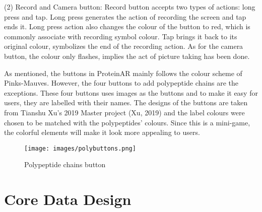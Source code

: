(2) Record and Camera button: Record button accepts two types of actions: long press and tap. Long press generates the action of recording the screen and tap ends it. Long press action also changes the colour of the button to red, which is commonly associate with recording symbol colour. Tap brings it back to its original colour, symbolizes the end of the recording action. As for the camera button, the colour only flashes, implies the act of picture taking has been done. 

As mentioned, the buttons in ProteinAR mainly follows the colour scheme of Pinks-Mauves. However, the four buttons to add polypeptide chains are the exceptions. These four buttons uses images as the buttons and to make it easy for users, they are labelled with their names. The designs of the buttons are taken from Tianshu Xu’s 2019 Master project (Xu, 2019) and the label colours were chosen to be matched with the polypeptides’ colours. Since this is a mini-game, the colorful elements will make it look more appealing to users. 
\begin{figure}[hbt!]
	\centering
	\texttt{[image: images/polybuttons.png]}
	\caption{Polypeptide chains button}
	\label{fig:polybuttons}
\end{figure}

\section{Core Data Design}





